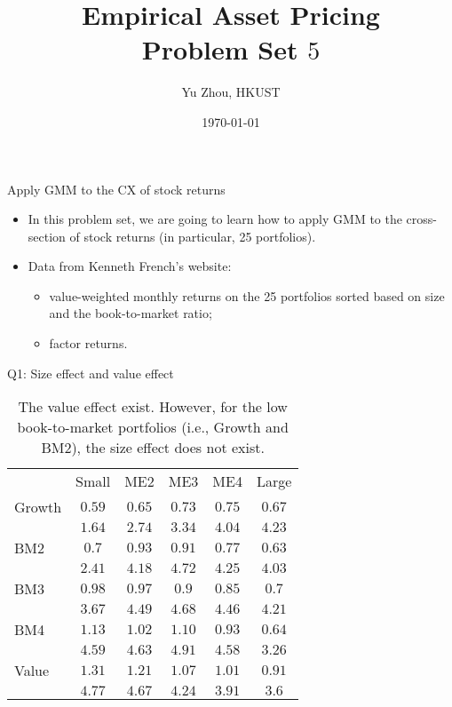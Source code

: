 \documentclass[10pt,t]{beamer}
\title{Empirical Asset Pricing \\ Problem Set $5$}
\author{Yu Zhou, HKUST}
\date{\today}
\begin{document}
\maketitle

\begin{frame}{Apply GMM to the CX of stock returns}
\begin{itemize}
	\item In this problem set, we are going to learn how to apply GMM to the cross-section of stock returns (in particular, 25 portfolios).
  \item Data from Kenneth French's website:
  \begin{itemize}
    \item value-weighted monthly returns on the 25 portfolios sorted based on size and the book-to-market ratio;
    \item factor returns.
  \end{itemize}
\end{itemize}
\end{frame}


\begin{frame}{Q1: Size effect and value effect}
\begin{table}
\begin{tabular}{lccccc}
\toprule
 & Small & ME2 & ME3 & ME4 & Large \\
\cmidrule{1-6}
Growth & $0.59$ & $0.65$ & $0.73$ & $0.75$ & $0.67$\\
& $1.64$ & $2.74$ & $3.34$ & $4.04$ & $4.23$ \\
BM2 & $0.7$ & $0.93$ & $0.91$ & $0.77$ & $0.63$\\
& $2.41$ & $4.18$ & $4.72$ & $4.25$ & $4.03$ \\
BM3 & $0.98$ & $0.97$ & $0.9$ & $0.85$ & $0.7$\\
& $3.67$ & $4.49$ & $4.68$ & $4.46$ & $4.21$ \\
BM4 & $1.13$ & $1.02$ & $1.10$ & $0.93$ & $0.64$\\
& $4.59$ & $4.63$ & $4.91$ & $4.58$ & $3.26$ \\
Value & $1.31$ & $1.21$ & $1.07$ & $1.01$ & $0.91$\\
& $4.77$ & $4.67$ & $4.24$ & $3.91$ & $3.6$ \\
\bottomrule
\end{tabular}
\caption{The value effect exist. However, for the low book-to-market portfolios (i.e., Growth and BM2), the size effect does not exist.}
\end{table}
\end{frame}
\end{document}
